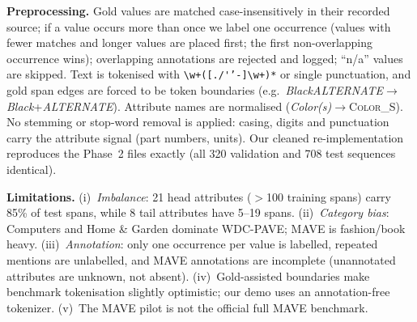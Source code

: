 \documentclass[10pt,twocolumn,a4paper]{article}
\begin{document}
\textbf{Preprocessing.} Gold values are matched case-insensitively in their recorded source; if a value occurs more than once we label one occurrence (values with fewer matches and longer values are placed first; the first non-overlapping occurrence wins); overlapping annotations are rejected and logged; ``n/a'' values are skipped. Text is tokenised with \verb|\w+([./'’-]\w+)*| or single punctuation, and gold span edges are forced to be token boundaries (e.g.\ \emph{BlackALTERNATE}$\rightarrow$\emph{Black}+\emph{ALTERNATE}). Attribute names are normalised (\emph{Color(s)}$\rightarrow$\textsc{Color\_S}). No stemming or stop-word removal is applied: casing, digits and punctuation carry the attribute signal (part numbers, units). Our cleaned re-implementation reproduces the Phase~2 files exactly (all 320 validation and 708 test sequences identical).

\textbf{Limitations.} (i)~\emph{Imbalance}: 21 head attributes ($>$100 training spans) carry 85\% of test spans, while 8 tail attributes have 5--19 spans. (ii)~\emph{Category bias}: Computers and Home \& Garden dominate WDC-PAVE; MAVE is fashion/book heavy. (iii)~\emph{Annotation}: only one occurrence per value is labelled, repeated mentions are unlabelled, and MAVE annotations are incomplete (unannotated attributes are unknown, not absent). (iv)~Gold-assisted boundaries make benchmark tokenisation slightly optimistic; our demo uses an annotation-free tokenizer. (v)~The MAVE pilot is not the official full MAVE benchmark.
\end{document}
